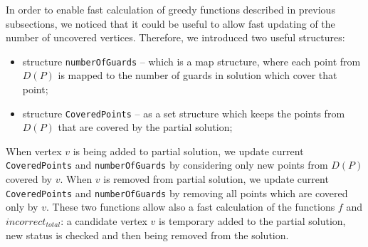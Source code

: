 \documentclass[runningheads,a4paper]{elsarticle}
\begin{document}
	In order to enable fast calculation of greedy functions described in previous subsections, we noticed that it could be useful to allow fast updating of the number of uncovered vertices. Therefore, we introduced two useful structures: %
	\begin{itemize}
		\item structure \texttt{numberOfGuards} -- which is a map structure, where each point from $D(P)$ is mapped to the number of guards in solution which cover that point;
		\item structure \texttt{CoveredPoints} -- as a set structure which keeps the points from $D(P)$ that are covered by the partial solution;
	\end{itemize}
  When vertex $v$ is being added to partial solution, we update current \texttt{CoveredPoints} and \texttt{numberOfGuards} by considering only new points from $D(P)$ covered by $v$. 
  When $v$ is removed from partial solution, we update current \texttt{CoveredPoints} and \texttt{numberOfGuards} by removing all points which are covered only by $v$.  These two functions allow also a fast calculation of the functions $f$ and  $incorrect_{total}$: a candidate vertex $v$ is temporary added to the partial solution, new status is checked and then being removed from the solution.


 
\end{document}
